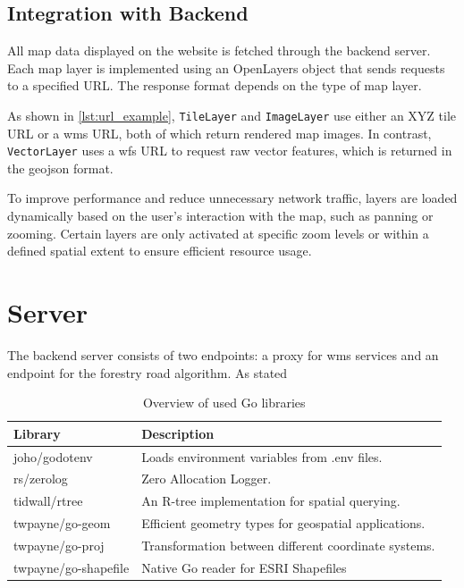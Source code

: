 \subsection{Integration with Backend}

All map data displayed on the website is fetched through the backend server. Each map layer is implemented using an OpenLayers object that sends requests to a specified URL. The response format depends on the type of map layer.

As shown in \autoref{lst:url_example}, \texttt{TileLayer} and \texttt{ImageLayer} use either an XYZ tile URL or a \gls{wms} URL, both of which return rendered map images. In contrast, \texttt{VectorLayer} uses a \gls{wfs} URL to request raw vector features, which is returned in the \gls{geojson} format.

\begin{figure}[h]

\end{figure}

To improve performance and reduce unnecessary network traffic, layers are loaded dynamically based on the user's interaction with the map, such as panning or zooming. Certain layers are only activated at specific zoom levels or within a defined spatial extent to ensure efficient resource usage.

\section{Server}\label{sec:implementation:server}

The backend server consists of two endpoints: a proxy for \Gls{wms} services and an endpoint for the forestry road algorithm. As stated 

\begin{table}[h]
    \centering
    \begin{tabular}{|l|l|}
        \hline
        \textbf{Library} & \textbf{Description} \\
        \hline
        joho/godotenv & Loads environment variables from .env files. \\
        rs/zerolog & Zero Allocation Logger. \\
        tidwall/rtree & An R-tree implementation for spatial querying. \\
        twpayne/go-geom & Efficient geometry types for geospatial applications. \\
        twpayne/go-proj & Transformation between different coordinate systems. \\
        twpayne/go-shapefile & Native Go reader for ESRI Shapefiles \\
        \hline
    \end{tabular}
    \caption{Overview of used Go libraries}
    \label{tab:go_libraries}
\end{table}

